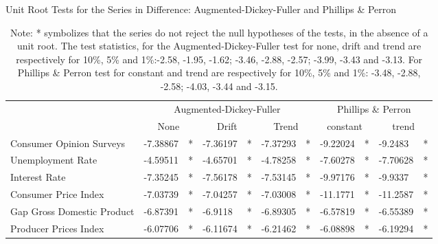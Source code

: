 \begin{table}[!h]
\caption{Unit Root Tests for the Series in Difference: Augmented-Dickey-Fuller and Phillips \& Perron}
\begin{adjustbox}{max width=\textwidth}
\begin{tabular}{lllllllllll}
\hline
                           & \multicolumn{6}{c|}{Augmented-Dickey-Fuller}                                        & \multicolumn{4}{c}{Phillips \& Perron}                    \\
                           & \multicolumn{2}{c|}{None} & \multicolumn{2}{c|}{Drift} & \multicolumn{2}{c|}{Trend} & \multicolumn{2}{c|}{constant} & \multicolumn{2}{c}{trend} \\ \hline
Consumer Opinion Surveys   & -7.38867        & *       & -7.36197        & *        & -7.37293        & *        & -9.22024          & *         & -9.2483         & *       \\
Unemployment Rate          & -4.59511        & *       & -4.65701        & *        & -4.78258        & *        & -7.60278          & *         & -7.70628        & *       \\
Interest Rate              & -7.35245        & *       & -7.56178        & *        & -7.53145        & *        & -9.97176          & *         & -9.9337         & *       \\
Consumer Price Index       & -7.03739        & *       & -7.04257        & *        & -7.03008        & *        & -11.1771          & *         & -11.2587        & *       \\
Gap Gross Domestic Product & -6.87391        & *       & -6.9118         & *        & -6.89305        & *        & -6.57819          & *         & -6.55389        & *       \\
Producer Prices Index      & -6.07706        & *       & -6.11674        & *        & -6.21462        & *        & -6.08898          & *         & -6.19294        & *       \\ \hline
\end{tabular}
\end{adjustbox}
\caption*{Note: * symbolizes that the series do not reject the null hypotheses of the tests, in the absence of a unit root. The test statistics, for the Augmented-Dickey-Fuller test for none, drift and trend are respectively for 10\%, 5\% and 1\%:-2.58, -1.95, -1.62; -3.46, -2.88, -2.57; -3.99, -3.43 and -3.13. For Phillips \& Perron test for constant and trend are respectively for 10\%, 5\% and 1\%: -3.48, -2.88, -2.58; -4.03, -3.44 and -3.15.}
\label{tab:urdiff}
\end{table}

